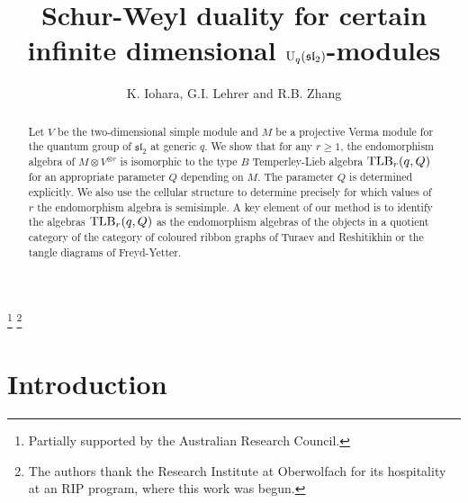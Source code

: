 \documentclass[12pt]{amsart}
\theoremstyle{definition}
\theoremstyle{remark}
\numberwithin{equation}{section}
\newcommand{\U}{{\rm{U}}}
\newcommand{\fsl}{{\mathfrak {sl}}}
\newcommand{\TLB}{{\rm{TLB}}}
\begin{document}
\normalfont

\title[Schur-Weyl duality]{%
Schur-Weyl duality for certain \\ infinite dimensional $\U_q(\fsl_2)$-modules}
\author{K. Iohara, G.I. Lehrer and R.B. Zhang} 
\thanks{Partially supported by the Australian Research Council.}
\thanks{The authors thank the Research Institute at Oberwolfach
for its hospitality at an RIP program, where this work was begun.}
\address{Univ Lyon, Universit\'{e} Claude Bernard Lyon 1, CNRS UMR 5208, Institut Camille Jordan, 
43 Boulevard du 11 Novembre 1918, F-69622 Villeurbanne cedex, France}
\address{School of Mathematics and Statistics,
University of Sydney, N.S.W. 2006, Australia}


\begin{abstract} 
Let $V$ be the two-dimensional simple module and $M$ be a projective Verma module for the quantum group of $\mathfrak{sl}_2$ at generic $q$.  
We show that for any $r\ge 1$, the endomorphism algebra of $M\otimes V^{\otimes r}$ is isomorphic to the type $B$ Temperley-Lieb 
 algebra $\TLB_r(q, Q)$ for an appropriate parameter $Q$ depending on $M$. The parameter $Q$ is determined explicitly. We also use the cellular 
 structure to determine precisely for which values of $r$ the endomorphism algebra is semisimple. A key element of our method is to identify 
 the algebras $\TLB_r(q,Q)$ as the endomorphism algebras of the objects 
 in a quotient category of the category of coloured ribbon graphs of Turaev and Reshitikhin or the tangle diagrams of Freyd-Yetter.
\end{abstract}



\maketitle


\tableofcontents

\section{Introduction} \label{sect:intro}
\end{document}
